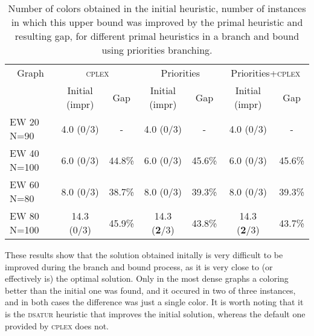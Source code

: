 \begin{table}[h]
\centering
\begin{tabular}{|l|cc|cc|cc|}
\hline
\multicolumn{1}{|c|}{Graph} & \multicolumn{2}{|c|}{\textsc{cplex}} & \multicolumn{2}{|c|}{Priorities} & \multicolumn{2}{|c|}{Priorities+\textsc{cplex}}
\\
& Initial (impr) & Gap & Initial (impr) & Gap & Initial (impr) & Gap\\
\hline
EW 20 N=90 & 4.0 (0/3) & - & 4.0 (0/3)& - & 4.0 (0/3)& -
\\
EW 40 N=100 & 6.0 (0/3) & 44.8\% & 6.0 (0/3) & 45.6\% & 6.0 (0/3) & 45.6\%
\\
EW 60 N=80 & 8.0 (0/3) & 38.7\% & 8.0 (0/3) & 39.3\% & 8.0 (0/3) & 39.3\%
\\
EW 80 N=100 & 14.3 (0/3) & 45.9\% & 14.3 (\textbf{2}/3) & 43.8\% & 14.3 (\textbf{2}/3) & 43.7\%
\\
\hline 
 \end{tabular}

\caption{Number of colors obtained in the initial heuristic, number of instances in which this upper bound was improved by the primal heuristic and resulting gap, for different primal heuristics in a branch and bound using priorities branching.}
\label{table:primal:prios}

\end{table}

These results show that the solution obtained initally is very difficult to be improved during the branch and bound process, as it is very close to (or effectively is) the optimal solution. Only in the most dense graphs a coloring better than the initial one was found, and it occured in two of three instances, and in both cases the difference was just a single color. It is worth noting that it is the \textsc{dsatur} heuristic that improves the initial solution, whereas the default one provided by \textsc{cplex} does not.

